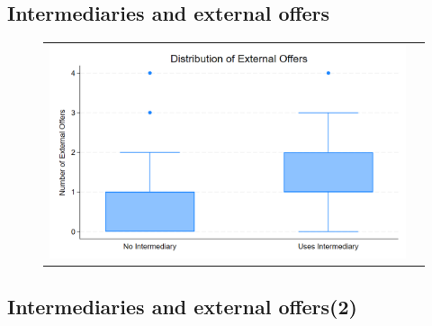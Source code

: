 \documentclass[12pt]{article}
\begin{document}



\newpage

\subsection{Intermediaries and external offers}



\begin{figure}[H]
\caption{}
 \label{fig:ie4_6and7}
\centering{}%
\begin{tabular}{cc}
\includegraphics[scale=0.17]{figures/IE4/IE4_intermediary_search_box.png} 
\end{tabular}
\end{figure}




\newpage

\subsection{Intermediaries and external offers(2)}





 

 
\end{document}

